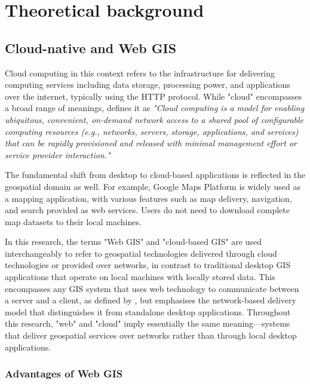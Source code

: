 \chapter{Theoretical background}
\label{ch:theoretical_background}

\section{Cloud-native and Web GIS}
\label{tb:cloud_native}
Cloud computing in this context refers to the infrastructure for delivering computing services including data storage, processing power, and applications over the internet, typically using the HTTP protocol. While "cloud" encompasses a broad range of meanings, \citet{nist_cloud_computing_2011} defines it as \emph{"Cloud computing is a model for enabling ubiquitous, convenient, on-demand network access to a shared pool of configurable computing resources (e.g., networks, servers, storage, applications, and services) that can be rapidly provisioned and released with minimal management effort or service provider interaction."}

The fundamental shift from desktop to cloud-based applications is reflected in the geospatial domain as well. For example, Google Maps Platform \citep{google_maps_platform} is widely used as a mapping application, with various features such as map delivery, navigation, and search provided as web services. Users do not need to download complete map datasets to their local machines.

In this research, the terms "Web GIS" and "cloud-based GIS" are used interchangeably to refer to geospatial technologies delivered through cloud technologies or provided over networks, in contrast to traditional desktop GIS applications that operate on local machines with locally stored data. This encompasses any GIS system that uses web technology to communicate between a server and a client, as defined by \citet{esri_webgis}, but emphasises the network-based delivery model that distinguishes it from standalone desktop applications. Throughout this research, "web" and "cloud" imply essentially the same meaning—systems that deliver geospatial services over networks rather than through local desktop applications.

\subsection{Advantages of Web GIS}
\label{tb:advantages_of_webgis}

